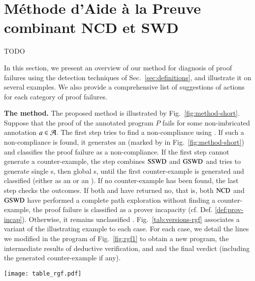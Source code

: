 
\chapter{Méthode d'Aide à la Preuve combinant NCD et SWD}
\label{sec:method}

\chapterintro

TODO



In this section, we present an overview of our method for 
diagnosis of proof failures using the detection techniques of Sec.~\ref{sec:definitions},
and illustrate it on several examples.
We also provide a comprehensive list of  suggestions of actions for 
each category of proof failures.

\textbf{The method.}
The proposed method is illustrated by Fig.~\ref{fig:method-short}.
Suppose that the proof of the annotated program $P$ fails for some non-imbricated annotation $a\in{\ensuremath\mathcal{A}}$.
The first step tries to find a non-compliance using \NCD. 
If such a non-compliance is found, it generates an \NCCE (marked by 
in Fig.~\ref{fig:method-short})
and classifies the proof failure as a non-compliance.
If the first step cannot generate a counter-example,
the \SWD step combines $\mathrm{SSWD}$ and $\mathrm{GSWD}$ 
and tries to generate single \SWCE{}s, then global \SWCE{}s, 
until the first counter-example is generated and classified 
(either as an \NCCE {} or an \SWCE {}).
If no counter-example has been found, the last step checks the outcomes.
If both \NCD and \SWD have returned \textsf{no}, that is, 
both  $\mathrm{NCD}$  and $\mathrm{GSWD}$ have performed a complete path exploration 
without finding a counter-example,
the proof failure is classified as a prover incapacity  (cf. Def. \ref{def:prov-incap}).
Otherwise, it  remains unclassified .
Fig.~\ref{tab:versions-rgf} associates a variant of the illustrating example to
each case.
For each case, we detail the lines we modified in the program of
Fig.~\ref{fig:rgf1} to obtain a new program, the intermediate results of
deductive verification, \NCD and \SWD and the final verdict (including the
generated counter-example if any).


\begin{figure*}[bt]\centering
  \texttt{[image: table\_rgf.pdf]}
  \caption{Method results for different versions of the illustrating example.}
  \label{tab:versions-rgf}
\end{figure*}


